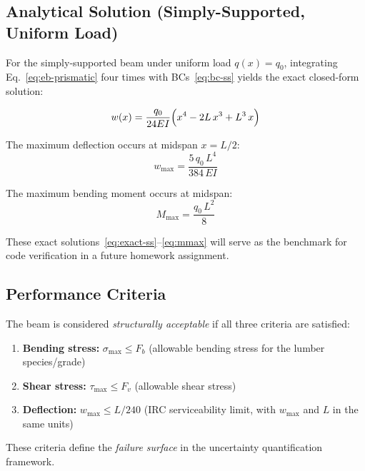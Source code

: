 \subsection{Analytical Solution (Simply-Supported, Uniform Load)}

For the simply-supported beam under uniform load $q(x) = q_0$, integrating Eq.~\eqref{eq:eb-prismatic} four times with BCs~\eqref{eq:bc-ss} yields the exact closed-form solution:

\begin{equation}
  w(x) = \frac{q_0}{24EI}\Bigl(x^4 - 2L\,x^3 + L^3\,x\Bigr)
  \label{eq:exact-ss}
\end{equation}

The maximum deflection occurs at midspan $x = L/2$:
\begin{equation}
  w_{\max} = \frac{5\,q_0\,L^4}{384\,EI}
  \label{eq:wmax}
\end{equation}

The maximum bending moment occurs at midspan:
\begin{equation}
  M_{\max} = \frac{q_0\,L^2}{8}
  \label{eq:mmax}
\end{equation}

These exact solutions~\eqref{eq:exact-ss}--\eqref{eq:mmax} will serve as the benchmark for code verification in a future homework assignment.

\subsection{Performance Criteria}

The beam is considered \emph{structurally acceptable} if all three criteria are satisfied:

\begin{enumerate}
  \item \textbf{Bending stress:} $\sigma_{\max} \leq F_b$ (allowable bending stress for the lumber species/grade)
  \item \textbf{Shear stress:} $\tau_{\max} \leq F_v$ (allowable shear stress)
  \item \textbf{Deflection:} $w_{\max} \leq L/240$ (IRC serviceability limit, with $w_{\max}$ and $L$ in the same units)
\end{enumerate}

These criteria define the \emph{failure surface} in the uncertainty quantification framework.
